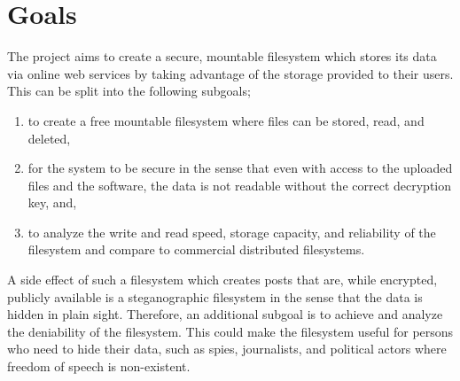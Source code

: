 
\section{Goals}


The project aims to create a secure, mountable filesystem which stores its data via online web services by taking advantage of the storage provided to their users. This can be split into the following subgoals;
\begin{enumerate}
\item to create a free mountable filesystem where files can be stored, read, and deleted, %
\item for the system to be secure in the sense that even with access to the uploaded files and the software, the data is not readable without the correct decryption key, and, %
\item to analyze the write and read speed, storage capacity, and reliability of the filesystem and compare to commercial distributed filesystems.
\end{enumerate}


A side effect of such a filesystem which creates posts that are, while encrypted, publicly available is a steganographic filesystem in the sense that the data is hidden in plain sight. Therefore, an additional subgoal is to achieve and analyze the deniability of the filesystem. This could make the filesystem useful for persons who need to hide their data, such as spies, journalists, and political actors where freedom of speech is non-existent.

